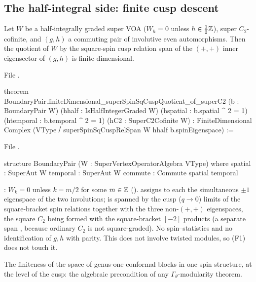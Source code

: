\subsection{The half-integral side: finite cusp descent}

\begin{theorem}\label{l17:thm:cusp}
Let $W$ be a half-integrally graded super VOA ($W_h=0$ unless $h\in\frac12{\mathbb{Z}}$), super $C_2$-cofinite, and
$(g,h)$ a commuting pair of involutive even automorphisms. Then the quotient of $W$ by the
square-spin cusp relation span of the $(+,+)$ inner eigensector of $(g,h)$ is finite-dimensional.
\end{theorem}
\noindent File .
\begin{leancode}
theorem BoundaryPair.finiteDimensional_superSpinSqCuspQuotient_of_superC2
    (b : BoundaryPair W) (hhalf : IsHalfIntegerGraded W)
    (hspatial : b.spatial ^ 2 = 1) (htemporal : b.temporal ^ 2 = 1)
    (hC2 : SuperC2Cofinite W) :
    FiniteDimensional Complex
      (VType ⧸ superSpinSqCuspRelSpan W hhalf b.spinEigenspace) :=
\end{leancode}
\noindent File .
\begin{leancode}
structure BoundaryPair (W : SuperVertexOperatorAlgebra VType) where
  spatial : SuperAut W
  temporal : SuperAut W
  commute : Commute spatial temporal
\end{leancode}
\begin{dictionary}
: $W_k=0$ unless $k=m/2$ for some $m\in{\mathbb{Z}}$ ().
 assigns to each  the simultaneous $\pm1$ eigenspace of the two
involutions;  is spanned by the cusp ($q\to0$) limits of the square-bracket
spin relations together with the three non-$(+,+)$ eigenspaces, the square $C_2$ being formed with the
square-bracket $[-2]$ products (a separate span , because ordinary $C_2$ is not
square-graded). No spin--statistics and no identification of $g,h$ with parity. This does not involve
twisted modules, so (F1) does not touch it.
\end{dictionary}
\begin{physics}
The finiteness of the space of genus-one conformal blocks in one spin structure, at the level of the
cusp: the algebraic precondition of any $\Gamma_\theta$-modularity theorem.
\end{physics}
